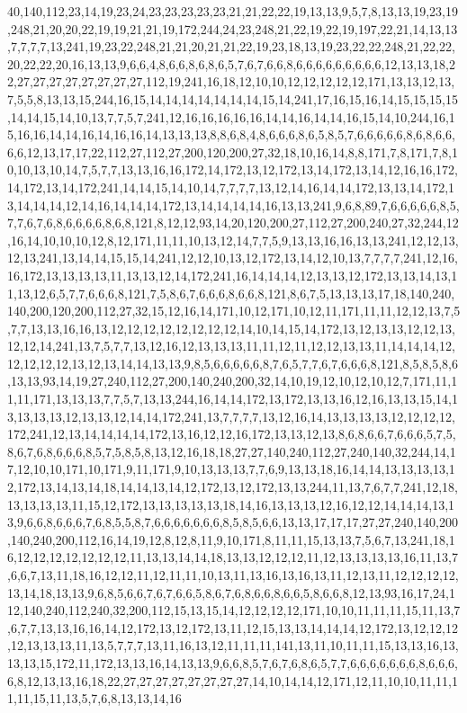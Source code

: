 40,140,112,23,14,19,23,24,23,23,23,23,23,21,21,22,22,19,13,13,9,5,7,8,13,13,19,23,19,248,21,20,20,22,19,19,21,21,19,172,244,24,23,248,21,22,19,22,19,197,22,21,14,13,13,7,7,7,7,13,241,19,23,22,248,21,21,20,21,21,22,19,23,18,13,19,23,22,22,248,21,22,22,20,22,22,20,16,13,13,9,6,6,4,8,6,6,8,6,8,6,5,7,6,7,6,6,8,6,6,6,6,6,6,6,6,6,12,13,13,18,22,27,27,27,27,27,27,27,27,112,19,241,16,18,12,10,10,12,12,12,12,12,171,13,13,12,13,7,5,5,8,13,13,15,244,16,15,14,14,14,14,14,14,14,15,14,241,17,16,15,16,14,15,15,15,15,14,14,15,14,10,13,7,7,5,7,241,12,16,16,16,16,16,14,14,16,14,14,16,15,14,10,244,16,15,16,16,14,14,16,14,16,16,14,13,13,13,8,8,6,8,4,8,6,6,6,8,6,5,8,5,7,6,6,6,6,6,8,6,8,6,6,6,6,12,13,17,17,22,112,27,112,27,200,120,200,27,32,18,10,16,14,8,8,171,7,8,171,7,8,10,10,13,10,14,7,5,7,7,13,13,16,16,172,14,172,13,12,172,13,14,172,13,14,12,16,16,172,14,172,13,14,172,241,14,14,15,14,10,14,7,7,7,7,13,12,14,16,14,14,172,13,13,14,172,13,14,14,14,12,14,16,14,14,14,172,13,14,14,14,14,16,13,13,241,9,6,8,89,7,6,6,6,6,6,8,5,7,7,6,7,6,8,6,6,6,6,8,6,8,121,8,12,12,93,14,20,120,200,27,112,27,200,240,27,32,244,12,16,14,10,10,10,12,8,12,171,11,11,10,13,12,14,7,7,5,9,13,13,16,16,13,13,241,12,12,13,12,13,241,13,14,14,15,15,14,241,12,12,10,13,12,172,13,14,12,10,13,7,7,7,7,241,12,16,16,172,13,13,13,13,11,13,13,12,14,172,241,16,14,14,14,12,13,13,12,172,13,13,14,13,11,13,12,6,5,7,7,6,6,6,8,121,7,5,8,6,7,6,6,6,8,6,6,8,121,8,6,7,5,13,13,13,17,18,140,240,140,200,120,200,112,27,32,15,12,16,14,171,10,12,171,10,12,11,171,11,11,12,12,13,7,5,7,7,13,13,16,16,13,12,12,12,12,12,12,12,12,14,10,14,15,14,172,13,12,13,13,12,12,13,12,12,14,241,13,7,5,7,7,13,12,16,12,13,13,13,11,11,12,11,12,12,13,13,11,14,14,14,12,12,12,12,12,13,12,13,14,14,13,13,9,8,5,6,6,6,6,6,8,7,6,5,7,7,6,7,6,6,6,8,121,8,5,8,5,8,6,13,13,93,14,19,27,240,112,27,200,140,240,200,32,14,10,19,12,10,12,10,12,7,171,11,11,11,171,13,13,13,7,7,5,7,13,13,244,16,14,14,172,13,172,13,13,16,12,16,13,13,15,14,13,13,13,13,12,13,13,12,14,14,172,241,13,7,7,7,7,13,12,16,14,13,13,13,13,12,12,12,12,172,241,12,13,14,14,14,14,172,13,16,12,12,16,172,13,13,12,13,8,6,8,6,6,7,6,6,6,5,7,5,8,6,7,6,8,6,6,6,8,5,7,5,8,5,8,13,12,16,18,18,27,27,140,240,112,27,240,140,32,244,14,17,12,10,10,171,10,171,9,11,171,9,10,13,13,13,7,7,6,9,13,13,18,16,14,14,13,13,13,13,12,172,13,14,13,14,18,14,14,13,14,12,172,13,12,172,13,13,244,11,13,7,6,7,7,241,12,18,13,13,13,13,11,15,12,172,13,13,13,13,13,18,14,16,13,13,13,12,16,12,12,14,14,14,13,13,9,6,6,8,6,6,6,7,6,8,5,5,8,7,6,6,6,6,6,6,6,8,5,8,5,6,6,13,13,17,17,17,27,27,240,140,200,140,240,200,112,16,14,19,12,8,12,8,11,9,10,171,8,11,11,15,13,13,7,5,6,7,13,241,18,16,12,12,12,12,12,12,12,11,13,13,14,14,18,13,13,12,12,12,11,12,13,13,13,13,16,11,13,7,6,6,7,13,11,18,16,12,12,11,12,11,11,10,13,11,13,16,13,16,13,11,12,13,11,12,12,12,12,13,14,18,13,13,9,6,8,5,6,6,7,6,7,6,6,5,8,6,7,6,8,6,6,8,6,6,5,8,6,6,8,12,13,93,16,17,24,112,140,240,112,240,32,200,112,15,13,15,14,12,12,12,12,171,10,10,11,11,11,15,11,13,7,6,7,7,13,13,16,16,14,12,172,13,12,172,13,11,12,15,13,13,14,14,14,12,172,13,12,12,12,12,13,13,13,11,13,5,7,7,7,13,11,16,13,12,11,11,11,141,13,11,10,11,11,15,13,13,16,13,13,13,15,172,11,172,13,13,16,14,13,13,9,6,6,8,5,7,6,7,6,8,6,5,7,7,6,6,6,6,6,6,6,8,6,6,6,6,8,12,13,13,16,18,22,27,27,27,27,27,27,27,27,14,10,14,14,12,171,12,11,10,10,11,11,11,11,15,11,13,5,7,6,8,13,13,14,16
